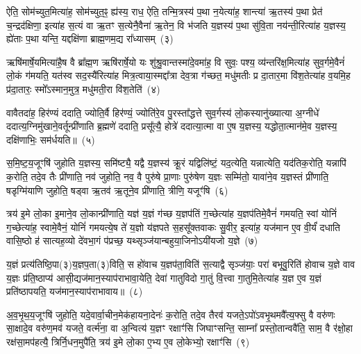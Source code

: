 ऐति॒ सोम॑च्युत॒मित्या॑ह॒ सोम॑च्युत॒ꣴ॒ ह्य॑स्य॒ राध॒ ऐति॒ तन्मि॒त्रस्य॑ प॒था न॒येत्या॑ह॒ शान्त्या॑ ऋ॒तस्य॑ प॒था प्रेत॑ च॒न्द्रद॑क्षिणा॒ इत्या॑ह स॒त्यं वा ऋ॒तꣳ स॒त्येनै॒वैना॑ ऋ॒तेन॒ वि भ॑जति य॒ज्ञस्य॑ प॒था सु॑वि॒ता नय॑न्ती॒रित्या॑ह य॒ज्ञस्य॒ ह्ये॑ताः प॒था यन्ति॒ यद्दक्षि॑णा ब्राह्म॒णम॒द्य रा᳚ध्यासम्~(३)

ऋषि॑मार्\mbox{}षे॒यमित्या॑है॒ष वै ब्रा᳚ह्म॒ण ऋषि॑रार्\mbox{}षे॒यो यः शु॑श्रु॒वान्तस्मा॑दे॒वमा॑ह॒ वि सुवः॒ पश्य॒ व्य॑न्तरि॑क्ष॒मित्या॑ह सुव॒र्गमे॒वैनं॑ लो॒कं ग॑मयति॒ यत॑स्व सद॒स्यै॑रित्या॑ह मित्र॒त्वाया॒स्मद्दा᳚त्रा देव॒त्रा ग॑च्छत॒ मधु॑मतीः प्र दा॒तार॒मा वि॑श॒तेत्या॑ह व॒यमि॒ह प्र॑दा॒तारः॒ स्मो᳚\-ऽस्मान॒मुत्र॒ मधु॑मती॒रा वि॑श॒तेति॑~(४)

वावैतदा॑ह॒ हिर॑ण्यं ददाति॒ ज्योति॒र्वै हिर॑ण्यं॒ ज्योति॑रे॒व पु॒रस्ता᳚द्धत्ते सुव॒र्गस्य॑ लो॒कस्यानु॑ख्यात्या अ॒ग्नीधे॑ ददात्य॒ग्निमु॑खाने॒वर्तून्प्री॑णाति ब्र॒ह्मणे॑ ददाति॒ प्रसू᳚त्यै॒ होत्रे॑ ददात्या॒त्मा वा ए॒ष य॒ज्ञस्य॒ यद्धोता॒त्मान॑मे॒व य॒ज्ञस्य॒ दक्षि॑णाभिः॒ सम॑र्धयति॥~(५)

{\anuvakamend[{हिर॑ण्य॒ꣳ॒ राधो॑ राध्यासम॒मुत्र॒ मधु॑मती॒रा वि॑श॒तेत्य॒ष्टात्रिꣳ॑शच्च}]}%

स॒मि॒ष्ट॒य॒जूꣳषि॑ जुहोति य॒ज्ञस्य॒ समि॑ष्ट्यै॒ यद्वै य॒ज्ञस्य॑ क्रू॒रं यद्विलि॑ष्टं॒ यद॒त्येति॒ यन्नात्येति॒ यद॑तिक॒रोति॒ यन्नापि॑ क॒रोति॒ तदे॒व तैः प्री॑णाति॒ नव॑ जुहोति॒ नव॒ वै पुरु॑षे प्रा॒णाः पुरु॑षेण य॒ज्ञः सम्मि॑तो॒ यावा॑ने॒व य॒ज्ञस्तं प्री॑णाति॒ षडृग्मि॑याणि जुहोति॒ षड्वा ऋ॒तव॑ ऋ॒तूने॒व प्री॑णाति॒ त्रीणि॒ यजूꣳ॑षि~(६)

त्रय॑ इ॒मे लो॒का इ॒माने॒व लो॒कान्प्री॑णाति॒ यज्ञ॑ य॒ज्ञं ग॑च्छ य॒ज्ञप॑तिं ग॒च्छेत्या॑ह य॒ज्ञप॑तिमे॒वैनं॑ गमयति॒ स्वां योनिं॑ ग॒च्छेत्या॑ह॒ स्वामे॒वैनं॒ योनिं॑ गमयत्ये॒ष ते॑ य॒ज्ञो य॑ज्ञपते स॒हसू᳚क्तवाकः सु॒वीर॒ इत्या॑ह॒ यज॑मान ए॒व वी॒र्यं॑ दधाति वासि॒ष्ठो ह॑ सात्यह॒व्यो दे॑वभा॒गं प॑प्रच्छ॒ यथ्सृञ्ज॑यान्बहुया॒जिनो\-ऽयी॑यजो य॒ज्ञे~(७)

य॒ज्ञं प्रत्य॑तिष्ठि॒पा(३)य॒ज्ञप॒ता(३)विति॒ स हो॑वाच य॒ज्ञप॑ता॒विति॑ स॒त्याद्वै सृञ्ज॑याः॒ परा॑ बभूवु॒रिति॑ होवाच य॒ज्ञे वाव य॒ज्ञः प्र॑ति॒ष्ठाप्य॑ आसी॒द्यज॑मान॒स्याप॑राभावा॒येति॒ देवा॑ गातुविदो गा॒तुं वि॒त्त्वा गा॒तुमि॒तेत्या॑ह य॒ज्ञ ए॒व य॒ज्ञं प्रति॑\-ष्ठापयति॒ यज॑मान॒स्याप॑राभावाय॥~(८)

{\anuvakamend[{यजूꣳ॑षि य॒ज्ञ एक॑चत्वारिꣳशच्च}]}%

अ॒व॒भृ॒थ॒य॒जूꣳषि॑ जुहोति॒ यदे॒वार्वा॒चीन॒मेक॑हायना॒देनः॑ क॒रोति॒ तदे॒व तैरव॑ यजते॒\-ऽपो॑\-ऽवभृ॒थमवै᳚त्य॒फ्सु वै वरु॑णः सा॒क्षादे॒व वरु॑ण॒मव॑ यजते॒ वर्त्म॑ना॒ वा अ॒न्वित्य॑ य॒ज्ञꣳ रक्षाꣳ॑सि जिघाꣳसन्ति॒ साम्ना᳚ प्रस्तो॒तान्ववै॑ति॒ साम॒ वै र॑क्षो॒हा रक्ष॑सा॒मप॑हत्यै॒ त्रिर्नि॒धन॒मुपै॑ति॒ त्रय॑ इ॒मे लो॒का ए॒भ्य ए॒व लो॒केभ्यो॒ रक्षाꣳ॑सि~(९)

